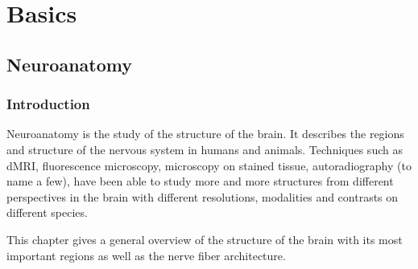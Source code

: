 \newpage\null\thispagestyle{empty}\newpage
\clearpage{\thispagestyle{empty}\cleardoublepage}
\part{Basics}
\parttoc
% 
% 
% 
\cleardoublepage
\setcounter{chapter}{1}
\chapter{Neuroanatomy}
\label{chap:neuro}
%
\section{Introduction}
%
Neuroanatomy is the study of the structure of the brain.
It describes the regions and structure of the nervous system in humans and animals.
Techniques such as \ac{dMRI}, fluorescence microscopy, microscopy on stained tissue, autoradiography (to name a few), have been able to study more and more structures from different perspectives in the brain with different resolutions, modalities and contrasts on different species.
\par
%
This chapter gives a general overview of the structure of the brain with its most important regions as well as the nerve fiber architecture.
% 
% 
%

